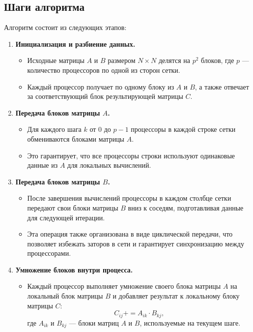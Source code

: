 \documentclass{report}
\begin{document}
\subsection*{Шаги алгоритма}

Алгоритм состоит из следующих этапов:

\begin{enumerate}
    \item \textbf{Инициализация и разбиение данных.} 
    \begin{itemize}
        \item Исходные матрицы \(A\) и \(B\) размером \(N \times N\) делятся на \(p^2\) блоков, где \(p\) — количество процессоров по одной из сторон сетки.
        \item Каждый процессор получает по одному блоку из \(A\) и \(B\), а также отвечает за соответствующий блок результирующей матрицы \(C\).
    \end{itemize}

    \item \textbf{Передача блоков матрицы \(A\).} 
    \begin{itemize}
        \item Для каждого шага \(k\) от 0 до \(p-1\) процессоры в каждой строке сетки обмениваются блоками матрицы \(A\).
        \item Это гарантирует, что все процессоры строки используют одинаковые данные из \(A\) для локальных вычислений.
    \end{itemize}

    \item \textbf{Передача блоков матрицы \(B\).}
    \begin{itemize}
        \item После завершения вычислений процессоры в каждом столбце сетки передают свои блоки матрицы \(B\) вниз к соседям, подготавливая данные для следующей итерации.
        \item Эта операция также организована в виде циклической передачи, что позволяет избежать заторов в сети и гарантирует синхронизацию между процессорами.
    \end{itemize}

    \item \textbf{Умножение блоков внутри процесса.}
    \begin{itemize}
        \item Каждый процессор выполняет умножение своего блока матрицы \(A\) на локальный блок матрицы \(B\) и добавляет результат к локальному блоку матрицы \(C\):
        \[ C_{ij} += A_{ik} \cdot B_{kj}, \]
        где \(A_{ik}\) и \(B_{kj}\) — блоки матриц \(A\) и \(B\), используемые на текущем шаге.
    \end{itemize}


\end{enumerate}
\end{document}

